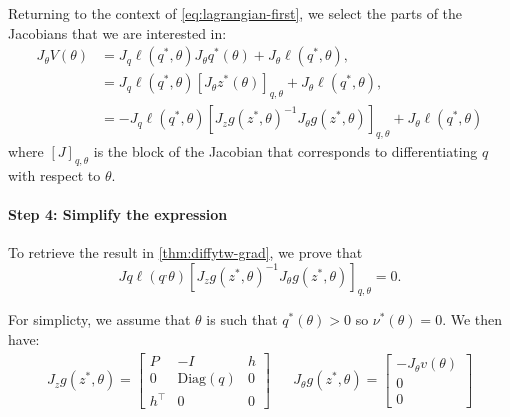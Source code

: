 Returning to the context of \cref{eq:lagrangian-first}, we select the parts of the Jacobians that we are interested in:
\begin{align}
J_\theta V(\theta) &=  J_q \ell(q^*, \theta)J_\theta q^*(\theta) + J_\theta \ell(q^*, \theta),\\
&= J_q \ell(q^*, \theta)  \left[J_\theta z^*(\theta)\right]_{q, \theta} + J_\theta \ell(q^*, \theta),\\
&= - J_q\ell(q^*, \theta) \left[J_z g(z^*, \theta)^{-1} J_\theta g(z^*, \theta)\right]_{q,\theta}+ J_\theta \ell(q^*, \theta)
\end{align}
where $[J]_{q, \theta}$ is the block of the Jacobian that corresponds to differentiating $q$ with respect to $\theta$.

\paragraph{Step 4: Simplify the expression} To retrieve the result in \cref{thm:diffytw-grad}, we prove that
\begin{equation}\label{appendix:goal}
Jq\ell(q^, \theta)\left[J_z g(z^*, \theta)^{-1} J_\theta g(z^*, \theta)\right]_{q,\theta}=0.
\end{equation}

For simplicty, we assume that $\theta$ is such that $q^*(\theta) > 0 $ so $\nu^*(\theta)=0$. We then have:
\begin{align}
    J_z g(z^*, \theta) = \begin{bmatrix}
    P & - I & h\\
    0 & \mathrm{Diag}(q)& 0\\
    h^\top  & 0 & 0
    \end{bmatrix} & &
    J_\theta g(z^*, \theta) = \begin{bmatrix}
    -J_\theta v(\theta)\\
    0 \\
    0
    \end{bmatrix}
\end{align}

